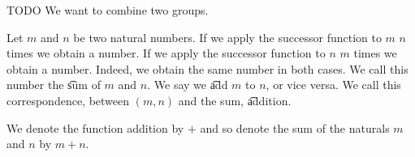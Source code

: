 

TODO
We want to combine two groups.


Let $m$ and $n$ be two natural numbers.
If we apply the successor function to $m$ $n$
times we obtain a number.
If we apply the successor function to $n$ $m$
times we obtain a number.
Indeed, we obtain the same number in both cases.
We call this number the \t{sum}
of $m$ and $n$.
We say we \t{add} $m$ to $n$,
or vice versa.
We call this correspondence, between
$(m, n)$ and the sum, \t{addition}.


We denote the function addition by $+$
and so denote the sum of the naturals
$m$ and $n$ by $m + n$.
